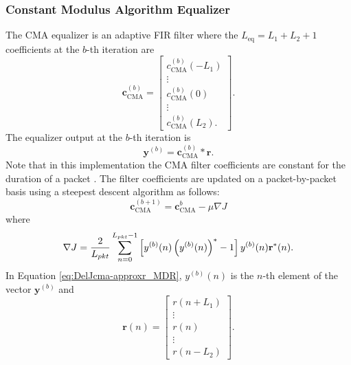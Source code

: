 \subsubsection{Constant Modulus Algorithm Equalizer}
The CMA equalizer is an adaptive FIR filter where the $L_\text{eq}=L_1+L_2+1$ coefficients at the $b$-th iteration are
\begin{equation}
\mathbf{c}_\text{CMA}^{(b)} = 
\begin{bmatrix}
c_\text{CMA}^{(b)}(-L_1) \\ \vdots \\ c_\text{CMA}^{(b)}(0) \\ \vdots \\ c_\text{CMA}^{(b)}(L_2).
\end{bmatrix}.
\end{equation}
The equalizer output at the $b$-th iteration is 
\begin{equation}
\mathbf{y}^{(b)} = 
\mathbf{c}_\text{CMA}^{(b)} \ast \mathbf{r}.
\end{equation}
Note that in this implementation the CMA filter coefficients are constant for the duration of a packet \cite{rice-afran-saquib-cole-rhodes-moazzami:2014}.
The filter coefficients are updated on a packet-by-packet basis using a steepest descent algorithm as follows:
\begin{equation}
\mathbf{c}_\text{CMA}^{(b+1)} = \mathbf{c}_\text{CMA}^{{b}}-\mu \nabla J
\label{eq:steepest}
\end{equation}
where
\begin{equation}
	\nabla J = \frac{2}{L_{pkt}} \sum_{n=0}^{L_{pkt}-1}
	\left[ \vphantom{\displaystyle\sum}  y^{(b)}(n) \left( y^{(b)}(n)\right)^\ast - 1 \right]
	y^{(b)}(n)  \mathbf{r}^\ast(n).
\label{eq:DelJcma-approxr_MDR}
\end{equation}
In Equation \eqref{eq:DelJcma-approxr_MDR}, $y^{(b)}(n)$ is the $n$-th element of the vector $\mathbf{y}^{(b)}$ and
\begin{equation}
\mathbf{r}(n) = \begin{bmatrix} r(n+L_1) \\ \vdots \\ r(n) \\ \vdots \\ r(n-L_2) \end{bmatrix}.
\end{equation}

